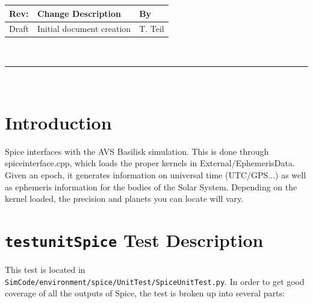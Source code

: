 \documentclass[]{BasiliskReportMemo}
\begin{document}
\makeCover


%
%
\pagestyle{empty}
{\renewcommand{\arraystretch}{1.1}
\noindent
\begin{longtable}{|p{0.5in}|p{4.5in}|p{1.14in}|}
\hline
{\bfseries Rev}: & {\bfseries Change Description} & {\bfseries By} \\
\hline
Draft & Initial document creation & T. Teil \\
\hline

\end{longtable}
}

\newpage
\setcounter{page}{1}
\pagestyle{fancy}

\tableofcontents
~\\ \hrule ~\\



\section{Introduction}
Spice interfaces with the AVS Basilisk simulation. This is done through spice\textunderscore interface.cpp, which loads the proper kernels in External/EphemerisData. Given an epoch, it generates information on universal time (UTC/GPS...) as well as ephemeris information for the bodies of the Solar System. Depending on the kernel loaded, the precision and planets you can locate will vary. 


\section{{\tt test\textunderscore unitSpice} Test Description}

This test is located in {\tt SimCode/environment/spice/UnitTest/SpiceUnitTest.py}. In order to get good coverage of all the outputs of Spice, the test is broken up into several parts: \par
\end{document}
